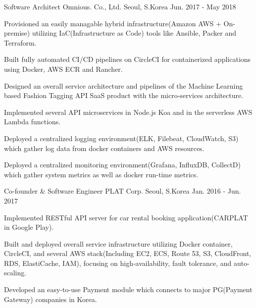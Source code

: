 \begin{cventries}
  \cventry
    {Software Architect} %
    {Omnious. Co., Ltd.} %
    {Seoul, S.Korea} %
    {Jun. 2017 - May 2018} %
    {
      \begin{cvitems} %
        \item {Provisioned an easily managable hybrid infrastructure(Amazon AWS + On-premise) utilizing IaC(Infrastructure as Code) tools like Ansible, Packer and Terraform.}
        \item {Built fully automated CI/CD pipelines on CircleCI for containerized applications using Docker, AWS ECR and Rancher.}
        \item {Designed an overall service architecture and pipelines of the Machine Learning based Fashion Tagging API SaaS product with the micro-services architecture.}
        \item {Implemented several API microservices in Node.js Koa and in the serverless AWS Lambda functions.}
        \item {Deployed a centralized logging environment(ELK, Filebeat, CloudWatch, S3) which gather log data from docker containers and AWS resources.}
        \item {Deployed a centralized monitoring environment(Grafana, InfluxDB, CollectD) which gather system metrics as well as docker run-time metrics.}
      \end{cvitems}
    }

  \cventry
    {Co-founder \& Software Engineer} %
    {PLAT Corp.} %
    {Seoul, S.Korea} %
    {Jan. 2016 - Jun. 2017} %
    {
      \begin{cvitems} %
        \item {Implemented RESTful API server for car rental booking application(CARPLAT in Google Play).}
        \item {Built and deployed overall service infrastructure utilizing Docker container, CircleCI, and several AWS stack(Including EC2, ECS, Route 53, S3, CloudFront, RDS, ElastiCache, IAM), focusing on high-availability, fault tolerance, and auto-scaling.}
        \item {Developed an easy-to-use Payment module which connects to major PG(Payment Gateway) companies in Korea.}
      \end{cvitems}
    }


\end{cventries}
